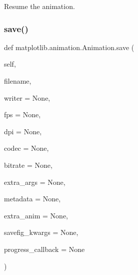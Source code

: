 \begin{DoxyVerb}Resume the animation.\end{DoxyVerb}
 \mbox{\label{classmatplotlib_1_1animation_1_1Animation_a0a349e2b499cbd08b014a2bafb86a8f8}} 
\subsubsection{\texorpdfstring{save()}{save()}}
{\footnotesize\ttfamily def matplotlib.\+animation.\+Animation.\+save (\begin{DoxyParamCaption}\item[{}]{self,  }\item[{}]{filename,  }\item[{}]{writer = {\ttfamily None},  }\item[{}]{fps = {\ttfamily None},  }\item[{}]{dpi = {\ttfamily None},  }\item[{}]{codec = {\ttfamily None},  }\item[{}]{bitrate = {\ttfamily None},  }\item[{}]{extra\+\_\+args = {\ttfamily None},  }\item[{}]{metadata = {\ttfamily None},  }\item[{}]{extra\+\_\+anim = {\ttfamily None},  }\item[{}]{savefig\+\_\+kwargs = {\ttfamily None},  }\item[{}]{progress\+\_\+callback = {\ttfamily None} }\end{DoxyParamCaption})}

